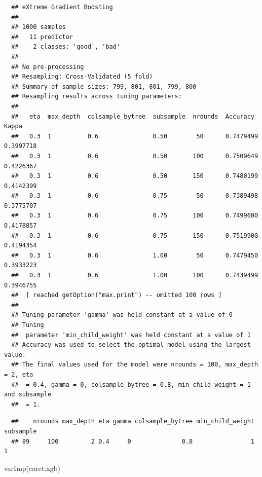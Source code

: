 \documentclass[
]{book}
\newenvironment{Shaded}{\begin{snugshade}}{\end{snugshade}}
\newcommand{\FunctionTok}[1]{\textcolor[rgb]{0.00,0.00,0.00}{#1}}
\newcommand{\NormalTok}[1]{#1}
\newcommand{\SpecialCharTok}[1]{\textcolor[rgb]{0.00,0.00,0.00}{#1}}
\theoremstyle{break}
\theoremstyle{nonumberplain}
\begin{document}
\begin{verbatim}
  ## eXtreme Gradient Boosting 
  ## 
  ## 1000 samples
  ##   11 predictor
  ##    2 classes: 'good', 'bad' 
  ## 
  ## No pre-processing
  ## Resampling: Cross-Validated (5 fold) 
  ## Summary of sample sizes: 799, 801, 801, 799, 800 
  ## Resampling results across tuning parameters:
  ## 
  ##   eta  max_depth  colsample_bytree  subsample  nrounds  Accuracy   Kappa    
  ##   0.3  1          0.6               0.50        50      0.7479499  0.3997718
  ##   0.3  1          0.6               0.50       100      0.7509649  0.4226367
  ##   0.3  1          0.6               0.50       150      0.7480199  0.4142399
  ##   0.3  1          0.6               0.75        50      0.7389498  0.3775707
  ##   0.3  1          0.6               0.75       100      0.7499600  0.4178857
  ##   0.3  1          0.6               0.75       150      0.7519900  0.4194354
  ##   0.3  1          0.6               1.00        50      0.7479450  0.3933223
  ##   0.3  1          0.6               1.00       100      0.7439499  0.3946755
  ##  [ reached getOption("max.print") -- omitted 100 rows ]
  ## 
  ## Tuning parameter 'gamma' was held constant at a value of 0
  ## Tuning
  ##  parameter 'min_child_weight' was held constant at a value of 1
  ## Accuracy was used to select the optimal model using the largest value.
  ## The final values used for the model were nrounds = 100, max_depth = 2, eta
  ##  = 0.4, gamma = 0, colsample_bytree = 0.8, min_child_weight = 1 and subsample
  ##  = 1.
\end{verbatim}

\begin{Shaded}
\end{Shaded}

\begin{verbatim}
  ##    nrounds max_depth eta gamma colsample_bytree min_child_weight subsample
  ## 89     100         2 0.4     0              0.8                1         1
\end{verbatim}

\begin{Shaded}
\begin{Highlighting}[]
\FunctionTok{varImp}\NormalTok{(caret.xgb)}
\end{Highlighting}
\end{Shaded}
\end{document}
